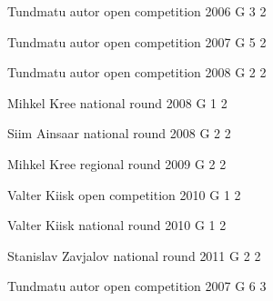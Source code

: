 \documentclass[11pt]{article}
\begin{document}
\ylDisplay{} %
{Tundmatu autor} %
{open competition} %
{2006} %
{G 3} %
{2} %
{

\ifEngStatement
\fi
}

\ylDisplay{} %
{Tundmatu autor} %
{open competition} %
{2007} %
{G 5} %
{2} %
{

\ifEngStatement
\fi
}

\ylDisplay{} %
{Tundmatu autor} %
{open competition} %
{2008} %
{G 2} %
{2} %
{

\ifEngStatement
\fi
}

\ylDisplay{} %
{Mihkel Kree} %
{national round} %
{2008} %
{G 1} %
{2} %
{

\ifEngStatement
\fi
}

\ylDisplay{} %
{Siim Ainsaar} %
{national round} %
{2008} %
{G 2} %
{2} %
{

\ifEngStatement
\fi
}

\ylDisplay{} %
{Mihkel Kree} %
{regional round} %
{2009} %
{G 2} %
{2} %
{

\ifEngStatement
\fi
}

\ylDisplay{} %
{Valter Kiisk} %
{open competition} %
{2010} %
{G 1} %
{2} %
{

\ifEngStatement
\fi
}

\ylDisplay{} %
{Valter Kiisk} %
{national round} %
{2010} %
{G 1} %
{2} %
{

\ifEngStatement
\fi
}

\ylDisplay{} %
{Stanislav Zavjalov} %
{national round} %
{2011} %
{G 2} %
{2} %
{

\ifEngStatement
\fi
}

\ylDisplay{} %
{Tundmatu autor} %
{open competition} %
{2007} %
{G 6} %
{3} %
{

\ifEngStatement
\fi
}
\end{document}

